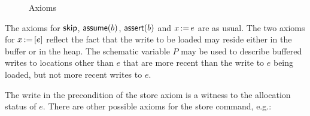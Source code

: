 \documentclass[11pt]{report}
\begin{document}
\begin{figure}[ht]
	\centering
	\caption{\label{fig:axioms}Axioms}
\end{figure}

The axioms for $\operatorname{\mathsf{skip}}$, $\operatorname{\mathsf{assume}}(b)$, $\operatorname{\mathsf{assert}}(b)$ and $x \operatorname{:\!=} e$ are as usual. The two axioms for $x \operatorname{:\!=} \left[ e \right]$ reflect the fact that the write to be loaded may reside either in the buffer or in the heap. The schematic variable $P$ may be used to describe buffered writes to locations other than $e$ that are more recent than the write to $e$ being loaded, but not more recent writes to $e$. 

The write in the precondition of the store axiom is a witness to the allocation status of $e$. There are other possible axioms for the store command, e.g.: 
\end{document}
